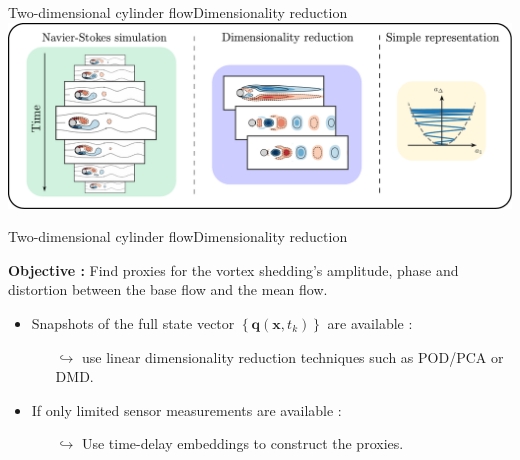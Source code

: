 \documentclass[usenames,dvipsnames,svgnames,10pt,aspectratio=169]{beamer}
\begin{document}
\begin{frame}[t, c]{Two-dimensional cylinder flow}{Dimensionality reduction}
  \centering
  \includegraphics[width=.8\textwidth]{reduced_order_modeling}
\end{frame}




\begin{frame}[t, c]{Two-dimensional cylinder flow}{Dimensionality reduction}
  \begin{minipage}{.68\textwidth}
    \begin{tcolorbox}[colback=white, colframe=beamer@kthblue]
      \textbf{Objective :} Find proxies for the vortex shedding's amplitude, phase and distortion between the base flow and the mean flow.
    \end{tcolorbox}

    \bigskip

    \begin{itemize}
    \item Snapshots of the full state vector $\left\{ \bm{q}(\bm{x}, t_k) \right\}$ are available :
      \begin{itemize}
      \item[$\hookrightarrow$] use linear dimensionality reduction techniques such as POD/PCA or DMD.
      \end{itemize}

      \medskip

    \item If only limited sensor measurements are available :
      \begin{itemize}
      \item[$\hookrightarrow$] Use time-delay embeddings to construct the proxies.
      \end{itemize}
    \end{itemize}
  \end{minipage}%
  \hfill
  \begin{minipage}{.28\textwidth}
  \end{minipage}
\end{frame}
\end{document}
